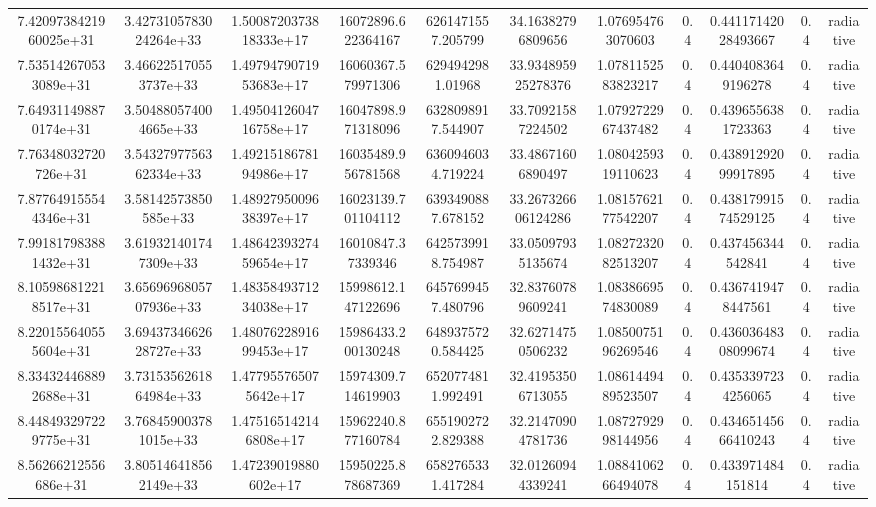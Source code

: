 \begin{table}
\begin{tabular}{ccccccccccc}
7.4209738421960025e+31 & 3.4273105783024264e+33 & 1.5008720373818333e+17 & 16072896.622364167 & 6261471557.205799 & 34.16382796809656 & 1.076954763070603 & 0.4 & 0.44117142028493667 & 0.4 & radiative \\
7.535142670533089e+31 & 3.466225170553737e+33 & 1.4979479071953683e+17 & 16060367.579971306 & 6294942981.01968 & 33.934895925278376 & 1.0781152583823217 & 0.4 & 0.4404083649196278 & 0.4 & radiative \\
7.649311498870174e+31 & 3.504880574004665e+33 & 1.4950412604716758e+17 & 16047898.971318096 & 6328098917.544907 & 33.70921587224502 & 1.0792722967437482 & 0.4 & 0.4396556381723363 & 0.4 & radiative \\
7.76348032720726e+31 & 3.5432797756362334e+33 & 1.4921518678194986e+17 & 16035489.956781568 & 6360946034.719224 & 33.48671606890497 & 1.0804259319110623 & 0.4 & 0.43891292099917895 & 0.4 & radiative \\
7.877649155544346e+31 & 3.58142573850585e+33 & 1.4892795009638397e+17 & 16023139.701104112 & 6393490887.678152 & 33.267326606124286 & 1.0815762177542207 & 0.4 & 0.43817991574529125 & 0.4 & radiative \\
7.991817983881432e+31 & 3.619321401747309e+33 & 1.4864239327459654e+17 & 16010847.37339346 & 6425739918.754987 & 33.05097935135674 & 1.0827232082513207 & 0.4 & 0.437456344542841 & 0.4 & radiative \\
8.105986812218517e+31 & 3.6569696805707936e+33 & 1.4835849371234038e+17 & 15998612.147122696 & 6457699457.480796 & 32.83760789609241 & 1.0838669574830089 & 0.4 & 0.4367419478447561 & 0.4 & radiative \\
8.220155640555604e+31 & 3.6943734662628727e+33 & 1.4807622891699453e+17 & 15986433.200130248 & 6489375720.584425 & 32.62714750506232 & 1.0850075196269546 & 0.4 & 0.43603648308099674 & 0.4 & radiative \\
8.334324468892688e+31 & 3.7315356261864984e+33 & 1.477955765075642e+17 & 15974309.714619903 & 6520774811.992491 & 32.41953506713055 & 1.0861449489523507 & 0.4 & 0.4353397234256065 & 0.4 & radiative \\
8.448493297229775e+31 & 3.768459003781015e+33 & 1.475165142146808e+17 & 15962240.877160784 & 6551902722.829388 & 32.21470904781736 & 1.0872792998144956 & 0.4 & 0.43465145666410243 & 0.4 & radiative \\
8.56266212556686e+31 & 3.805146418562149e+33 & 1.47239019880602e+17 & 15950225.878687369 & 6582765331.417284 & 32.01260944339241 & 1.0884106266494078 & 0.4 & 0.433971484151814 & 0.4 & radiative \\

\end{tabular}
\end{table}
